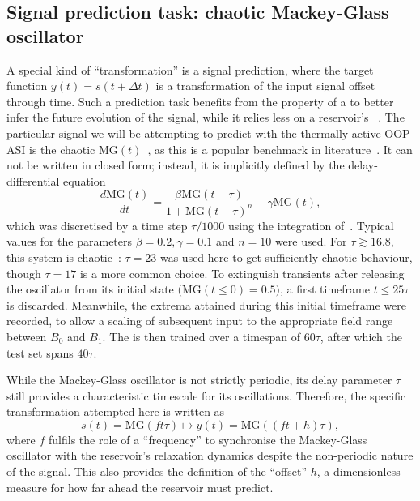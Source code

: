 \subsection{Signal prediction task: chaotic Mackey-Glass oscillator} \label{sec:3:Thermal_Prediction}
A special kind of ``transformation'' is a signal prediction, where the target function $y(t) = s(t + \Delta t)$ is a transformation of the input signal offset through time.
Such a prediction task benefits from the  property of a  to better infer the future evolution of the signal, while it relies less on a reservoir's ~\cite{TaskAdaptivePRC,NeuromorphicFewShot}.
The particular signal we will be attempting to predict with the thermally active OOP ASI is the chaotic  $\mathrm{MG}(t)$~\cite{MackeyGlass}, as this is a popular benchmark in literature~\cite{RotatingNeuronsRC,NeuromorphicFewShot,TaskAdaptivePRC,Moon_2021,JaegerHaasWireless,ArchitecturalMarkovianESN}.
It can not be written in closed form; instead, it is implicitly defined by the delay-differential equation
\begin{equation}
	\label{eq:3:MG}
	\frac{d\mathrm{MG}(t)}{dt} = \frac{\beta \mathrm{MG}(t - \tau)}{1 + \mathrm{MG}(t - \tau)^n} - \gamma \mathrm{MG}(t) \mathrm{,}
\end{equation}
which was discretised by a time step $\tau/1000$ using the integration of~.
Typical values for the parameters $\beta=0.2, \gamma=0.1$ and $n=10$ were used.
For $\tau \gtrsim 16.8$, this system is chaotic~\cite{jaeger2001echo}: $\tau=23$ was used here to get sufficiently chaotic behaviour, though $\tau=17$ is a more common choice.
To extinguish transients after releasing the oscillator from its initial state $\big(\mathrm{MG}(t \leq 0) = 0.5\big)$, a first timeframe $t \leq 25\tau$ is discarded.
Meanwhile, the extrema attained during this initial timeframe were recorded, to allow a scaling of subsequent input to the appropriate field range between $B_0$ and $B_1$.
The  is then trained over a timespan of $60\tau$, after which the test set spans $40\tau$. \par
While the Mackey-Glass oscillator is not strictly periodic, its delay parameter $\tau$ still provides a characteristic timescale for its oscillations.
Therefore, the specific transformation attempted here is written as
\begin{equation}
	s(t) = \mathrm{MG}(ft\tau) \mapsto y(t) = \mathrm{MG}((ft + h)\tau) \mathrm{,}
\end{equation}
where $f$ fulfils the role of a ``frequency'' to synchronise the Mackey-Glass oscillator with the reservoir's relaxation dynamics despite the non-periodic nature of the signal.
This also provides the definition of the ``offset'' $h$, a dimensionless measure for how far ahead the reservoir must predict. \\\par

